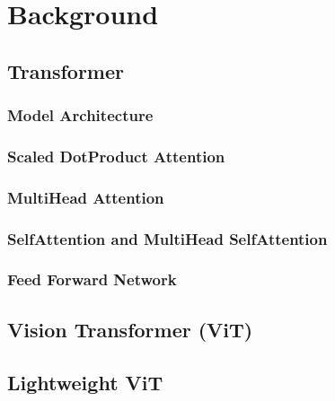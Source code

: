 \chapter{Background}
\minitoc

\section{Transformer}\label{sec:transformer}

\subsection{Model Architecture}

\subsection{Scaled Dot\textendash Product Attention}

\subsection{Multi\textendash Head Attention}

\subsection{Self\textendash Attention and Multi\textendash Head Self\textendash Attention}

\subsection{Feed Forward Network}

\section{Vision Transformer (ViT)}

\section{Lightweight ViT}
